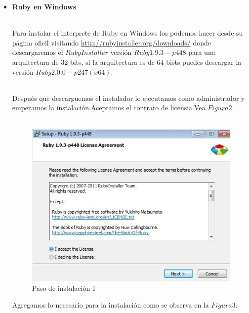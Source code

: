 \documentclass[11pt]{article} %
\begin{document}
\begin{itemize}
\item{\bf Ruby en Windows\\ \\}

Para instalar el interprete de Ruby en Windows los podemos hacer desde su página oficil visitando  \url{http://rubyinstaller.org/downloads/}  donde descargaremos el $Ruby Installer$ versión $Ruby 1.9.3-p448$ para una arquitectura de 32 bits, si la arquitectura es de 64 bists puedes descargar la versión $Ruby 2.0.0-p247 (x64)$.\\ \\

{Después que descarguemos el instalador lo ejecutamos como administrador y empezamos la instalación.Aceptamos el contrato de licensia.Vea $Figura 2$.\\ \\
\begin{figure}[h]
\centering
 \includegraphics[width=12cm]{./imagenes/PasoInst1.jpg}
\caption{Paso de instalación 1}\label{Fig:Paso1}
\end{figure}}

\newpage
{Agregamos lo necesario para la instalación como se observa en la $ Figura 3$.\\ \\

}
\end{itemize}
\end{document}
